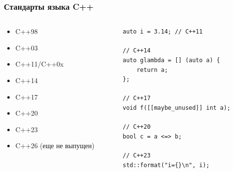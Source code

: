 \documentclass[compress]{beamer}
\begin{document}
\begin{frame}[fragile]

    \frametitle{Стандарты языка C++}

    \begin{columns}

        \begin{column}{0.4\textwidth}

            \begin{itemize}

                \item C++98
                \item C++03
                \item C++11/C++0x
                \item C++14
                \item C++17
                \item C++20
                \item C++23
                \item C++26 (еще не выпущен)

            \end{itemize}

        \end{column}

        \begin{column}{0.6\textwidth}

            \begin{verbatim}
auto i = 3.14; // C++11

// C++14
auto glambda = [] (auto a) {
    return a;
};

// C++17
void f([[maybe_unused]] int a);

// C++20
bool c = a <=> b;

// C++23
std::format("i={}\n", i);
            \end{verbatim}
        \end{column}

    \end{columns}

\end{frame}
\end{document}
